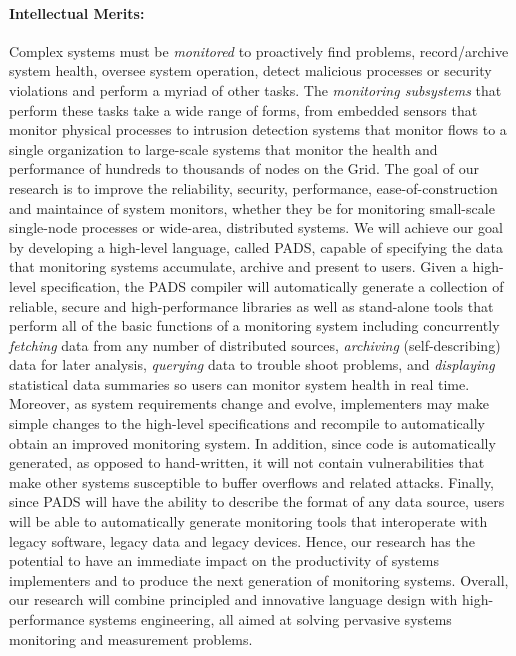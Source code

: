 
\paragraph*{Intellectual Merits:} 
Complex systems must be {\em monitored} to proactively find problems,
record/archive system health, oversee system operation, detect
malicious processes or security violations and perform a myriad of other tasks.
The {\em monitoring subsystems} 
that perform these tasks take a wide range of forms, 
from embedded sensors that monitor physical processes to
intrusion detection systems that monitor flows to a single
organization to large-scale systems
that monitor the health and performance of hundreds to thousands of nodes
on the Grid.  
The goal of our research is to improve the reliability, security,
performance, ease-of-construction and maintaince of system monitors, 
whether they
be for monitoring small-scale single-node processes or wide-area, 
distributed systems.  We will achieve our goal by developing a 
high-level language, called PADS, capable of specifying
the data that monitoring systems accumulate, 
archive and present to users.  Given a high-level specification,
the PADS compiler will automatically generate a collection of
reliable, secure and high-performance libraries as well as stand-alone
tools that perform all of the basic functions of a monitoring system
including concurrently {\em fetching} data from any number of distributed
sources, {\em archiving} (self-describing) data for later analysis,
{\em querying} data to trouble shoot problems, and {\em displaying}
statistical data summaries so users can monitor system health in real time.
Moreover, as system requirements change and evolve, implementers may make
simple changes to the high-level specifications and recompile to 
automatically obtain an improved monitoring system.  In addition,
since code is automatically generated, as opposed to hand-written, 
it will not contain vulnerabilities
that make other systems susceptible to buffer overflows and related attacks.  
Finally, since
PADS will have the ability to describe the format of 
any data source, users will be able
to automatically generate monitoring tools that interoperate with
legacy software, legacy data and legacy devices.  
Hence, our
research has the potential to have an immediate impact on the productivity of
systems implementers and to produce the next generation of monitoring systems.
Overall, our research will combine principled and innovative language design 
with high-performance systems engineering, all aimed at solving
pervasive systems monitoring and measurement problems.

